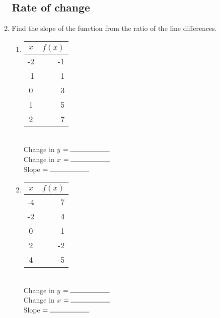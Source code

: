 \documentclass[12pt, oneside]{article}
\begin{document}
\begin{enumerate}
\newpage
\subsection*{Rate of change}

\item Find the slope of the function from the ratio of the line differences.

  \begin{multicols}{2}
  \begin{enumerate}
    \item
      \begin{tabular}{|c|r|}
      \hline
      $x$ & $f(x)$\\
      \hline
      -2 & -1 \\
      \hline
      -1 & 1 \\
      \hline
      0 & 3 \\
      \hline
      1 & 5 \\
      \hline
      2 & 7 \\
      \hline
      \end{tabular}\\[0.85cm]

      Change in $y$ $= \rule{2cm}{0.15mm}$ \\[0.5cm]
      Change in $x$ $= \rule{2cm}{0.15mm}$ \\[0.5cm]
      Slope $= \rule{2cm}{0.15mm}$\\


    \item
      \begin{tabular}{|c|r|}
      \hline
      $x$ & $f(x)$\\
      \hline
      -4 & 7 \\
      \hline
      -2 & 4 \\
      \hline
      0 & 1 \\
      \hline
      2 & -2 \\
      \hline
      4 & -5 \\
      \hline
      \end{tabular}\\[0.85cm]

      Change in $y$ $= \rule{2cm}{0.15mm}$ \\[0.5cm]
      Change in $x$ $= \rule{2cm}{0.15mm}$ \\[0.5cm]
      Slope $= \rule{2cm}{0.15mm}$\\

    \end{enumerate}
    \end{multicols}


\end{enumerate}
\end{document}
